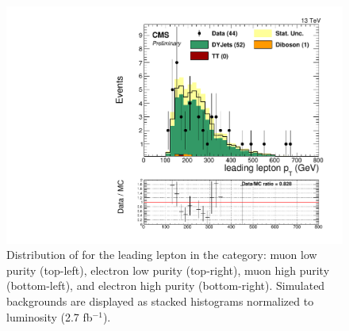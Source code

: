\begin{figure}[h]
\begin{center}
\includegraphics[scale=0.37]{figures/control/ptlep1EHP.pdf}
\caption[Distribution of \ptrans for the leading lepton]{Distribution of \ptrans for the leading lepton in the category: muon low purity (top-left), electron low purity (top-right), muon high purity (bottom-left), and  electron high purity (bottom-right). Simulated backgrounds are displayed as stacked histograms normalized to luminosity (2.7 fb$^{-1}$).}
\label{ptlep1_VZ}
\end{center}
\end{figure}
